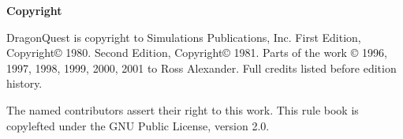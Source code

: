 \thispagestyle{empty}

\vspace*{\fill}

\textbf{Copyright}

DragonQuest is copyright to Simulations Publications, Inc.  First
Edition, Copyright\copyright{} 1980.  Second Edition,
Copyright\copyright{} 1981.  Parts of the work \copyright{} 1996,
1997, 1998, 1999, 2000, 2001 to Ross Alexander.  Full credits listed
before edition history.

The named contributors assert their right to this work.  This rule
book is copylefted under the GNU Public License, version 2.0.
